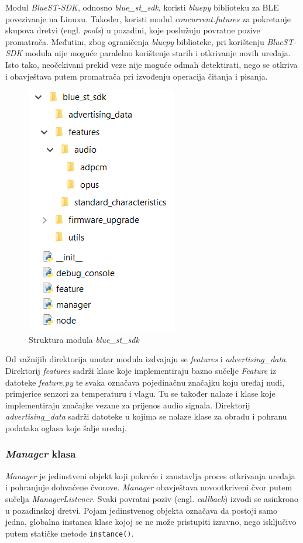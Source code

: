 Modul \textit{BlueST-SDK}, odnosno \textit{blue\_st\_sdk}, koristi \textit{bluepy} biblioteku za BLE povezivanje na Linuxu. Također, koristi modul \textit{concurrent.futures} za pokretanje skupova dretvi (engl. \textit{pools}) u pozadini, koje poslužuju povratne pozive promatrača. Međutim, zbog ograničenja \textit{bluepy} biblioteke, pri korištenju \textit{BlueST-SDK} modula nije moguće paralelno korištenje starih i otkrivanje novih uređaja. Isto tako, neočekivani prekid veze nije moguće odmah detektirati, nego se otkriva i obavještava putem promatrača pri izvođenju operacija čitanja i pisanja. 

\begin{figure}[ht]
	\centering
	\includegraphics[scale=0.8]{imgs/sdk_folder_struct}
	\caption{Struktura modula \textit{blue\_st\_sdk}}
	\label{fig:sdk_folder_struct}
\end{figure}

Od važnijih direktorija unutar modula izdvajaju se \textit{features} i \textit{advertising\_data}. Direktorij \textit{features} sadrži klase koje implementiraju bazno sučelje \textit{Feature} iz datoteke \textit{feature.py} te svaka označava pojedinačnu značajku koju uređaj nudi, primjerice senzori za temperaturu i vlagu. Tu se također nalaze i klase koje implementiraju značajke vezane za prijenos audio signala. Direktorij \textit{advertising\_data} sadrži datoteke u kojima se nalaze klase za obradu i pohranu podataka oglasa koje šalje uređaj. 


\subsubsection{\textit{Manager} klasa}
\textit{Manager} je jedinstveni objekt koji pokreće i zaustavlja proces otkrivanja uređaja i pohranjuje dohvaćene čvorove. \textit{Manager} obavještava novootkriveni čvor putem sučelja \textit{ManagerListener}. Svaki povratni poziv (engl. \textit{callback}) izvodi se asinkrono u pozadinskoj dretvi. Pojam jedinstvenog objekta označava da postoji samo jedna, globalna instanca klase kojoj se ne može pristupiti izravno, nego isključivo putem statičke metode \lstinline|instance()|.

